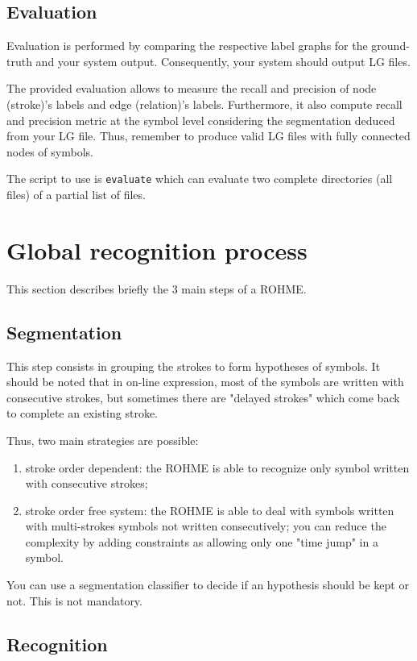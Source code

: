 \documentclass{article}
\begin{document}
\subsection{Evaluation}
Evaluation is performed by comparing the respective label graphs for the ground-truth and your system output. 
Consequently, your system should output LG files. 

The provided evaluation allows to measure the recall and precision of node (stroke)'s  labels and edge (relation)'s labels. Furthermore, it also compute recall and precision metric at the symbol level considering the segmentation deduced from your LG file. Thus, remember to produce valid LG files with fully connected nodes of symbols.

The script to use is \texttt{evaluate} which can evaluate two complete directories (all files) of a partial list of files.

\section{Global recognition process}

This section describes briefly the 3 main steps of a ROHME.
\subsection{Segmentation}
This step consists in grouping the strokes to form hypotheses of symbols. 
It should be noted that in on-line expression, most of  the symbols are written with consecutive strokes, but sometimes there are "delayed strokes" which come back to complete an existing stroke. 

Thus, two main strategies are possible:
\begin{enumerate}
\item stroke order dependent: the ROHME is able to recognize only symbol written with consecutive strokes;
\item stroke order free system: the ROHME is able to deal with symbols written with multi-strokes symbols not written consecutively; you can reduce the complexity by adding constraints as allowing only one "time jump" in a symbol.
\end{enumerate}

You can use a segmentation classifier to decide if an hypothesis should be kept or not. This is not mandatory.


\subsection{Recognition}
\end{document}
